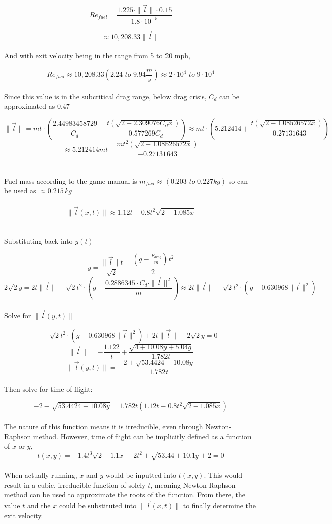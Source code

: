 \documentclass{article}
\begin{document}
\[Re_{fuel} = \frac{1.225 \cdot \|\vec{l}\| \cdot 0.15}{1.8 \cdot 10^{-5}}\]

\[\approx 10,208.33\|\vec{l}\|\]
\\
And with exit velocity being in the range from 5 to 20 mph,

\[Re_{fuel} \approx 10,208.33(2.24 \,\, to \,\, 9.94 \frac{m}{s}) \approx 2 \cdot 10^4 \,\, to \,\, 9 \cdot 10^4\]
\\
Since this value is in the subcritical drag range, below drag crisis, $C_d$ can be approximated as $0.47$

\[\|\vec{l}\| = mt \cdot (\frac{2.44983458729}{C_d} + \frac{t(\sqrt{2 - 2.309076C_dx})}{-0.577269C_d}) \approx mt \cdot (5.212414 + \frac{t(\sqrt{2-1.08526572x})}{-0.27131643})\]
\[\approx 5.212414mt +\frac{mt^2(\sqrt{2-1.08526572x})}{-0.27131643}\]
\\\\
Fuel mass according to the game manual is $m_{fuel} \approx (0.203 \,\, to \,\, 0.227kg)$ so can be used as $\approx 0.215 \,kg$
\\\\
\[\boxed{\|\vec{l}(x,t)\| \approx 1.12t - 0.8t^2\sqrt{2-1.085x}}\]
\\\\
Substituting back into $y(t)$

\[ y = \frac{\|\vec{l}\|t}{\sqrt{2}} - \frac{(g-\frac{F_{drag}}{m})t^2}{2}\]
\[2 \sqrt{2}y = 2t\|\vec{l}\| - \sqrt{2}t^2\cdot(g-\frac{0.2886345 \cdot C_d \cdot \|\vec{l}\|^2}{m}) \approx 2t\|\vec{l}\| -\sqrt{2}t^2 \cdot (g-0.630968\|\vec{l}\|^2)\]
\\
Solve for $\|\vec{l}(y,t)\|$

\[-\sqrt{2}t^2 \cdot (g-0.630968\|\vec{l}\|^2) + 2t\|\vec{l}\| - 2 \sqrt{2}y = 0\]
\[\|\vec{l}\| = -\frac{1.122}{t} + \frac{\sqrt{4 + 10.08y + 5.04g}}{1.782t}\]
\[\boxed{\|\vec{l}(y,t)\| = -\frac{2 + \sqrt{53.4424 + 10.08y}}{1.782t}}\]
\\
Then solve for time of flight:

\[-2 - \sqrt{53.4424 + 10.08y} = 1.782t(1.12t - 0.8t^2\sqrt{2-1.085x})\]
\\
The nature of this function means it is irreducible, even through Newton-Raphson method. However, time of flight can be implicitly defined as a function of $x$ or $y$,
\[\boxed{t(x,y) = -1.4t^3\sqrt{2-1.1x} + 2t^2 + \sqrt{53.44 + 10.1y} + 2 = 0}\]
\\
When actually running, $x$ and $y$ would be inputted into $t(x,y)$. This would result in a cubic, irreducible function of solely $t$, meaning Newton-Raphson method can be used to approximate the roots of the function.
From there, the value $t$ and the $x$ could be substituted into $\|\vec{l}(x,t)\|$ to finally determine the exit velocity. 
\end{document}
